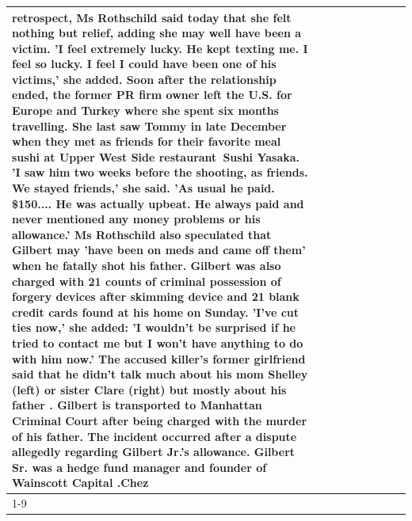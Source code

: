 \begin{table}[H]
\begin{tabular}{lllrlllll}
retrospect, Ms Rothschild said today that she felt nothing but relief, adding she may well have been a victim. 'I feel extremely lucky. He kept texting me. I feel so lucky. I feel I could have been one of his victims,' she added. Soon after the relationship ended, the former PR firm owner left the U.S. for Europe and Turkey where she spent six months  travelling. She last saw Tommy in late December when they met as friends for their favorite meal sushi at Upper West Side restaurant Sushi Yasaka. 'I saw him two weeks before the shooting, as friends. We stayed friends,' she said. 'As usual he paid. \$150.... He was actually upbeat. He always paid and never mentioned any money problems or his allowance.' Ms Rothschild also speculated that Gilbert may 'have been on meds and came off them' when he fatally shot his father. Gilbert was also charged with 21 counts of criminal possession of forgery devices after skimming device and 21 blank credit cards found at his home on Sunday. 'I've cut ties now,' she added: 'I wouldn’t be surprised if he tried to contact me but I won’t have anything to do with him now.' The accused killer's former girlfriend said that he didn't talk much about his mom Shelley (left) or sister Clare (right) but mostly about his father . Gilbert is transported to Manhattan Criminal Court  after being charged with the murder of his father. The incident occurred after a dispute allegedly regarding Gilbert Jr.'s allowance. Gilbert Sr. was a hedge fund manager and founder of Wainscott Capital .Chez \\
\cline{1-9}

\end{tabular}
\end{table}
